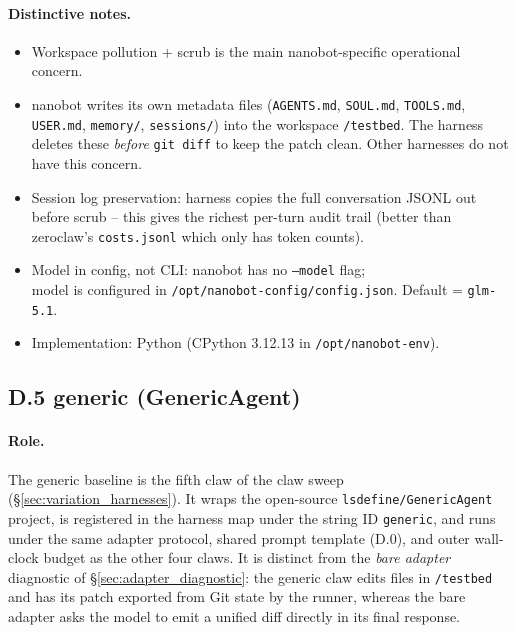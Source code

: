 \documentclass{llmxive}
\providecommand{\model}{\textsc{Model}}
\begin{document}
\paragraph{Distinctive notes.}
\begin{itemize}
  \item Workspace pollution + scrub is the main nanobot-specific operational concern.
  \item nanobot writes its own metadata files (\texttt{AGENTS.md}, \texttt{SOUL.md}, \texttt{TOOLS.md}, \texttt{USER.md}, \texttt{memory/}, \texttt{sessions/}) into the workspace \texttt{/testbed}. The harness deletes these \emph{before} \texttt{git diff} to keep the patch clean. Other harnesses do not have this concern.
  \item Session log preservation: harness copies the full conversation JSONL out before scrub -- this gives the richest per-turn audit trail (better than zeroclaw's \texttt{costs.jsonl} which only has token counts).
  \item Model in config, not CLI: nanobot has no \texttt{--model} flag;\\model is configured in \texttt{/opt/nanobot-config/config.json}. Default = \texttt{glm-5.1}.
  \item Implementation: Python (CPython 3.12.13 in \texttt{/opt/nanobot-env}).
\end{itemize}

\subsection*{D.5 generic (GenericAgent)}

\paragraph{Role.}
The generic baseline is the fifth claw of the claw sweep
(\S\ref{sec:variation_harnesses}). It wraps the open-source
\texttt{lsdefine/GenericAgent} project, is registered in the harness map under
the string ID \texttt{generic}, and runs under the same adapter protocol,
shared prompt template (D.0), and outer wall-clock budget as the other four
claws. It is distinct from the \emph{bare adapter} diagnostic of
\S\ref{sec:adapter_diagnostic}: the generic claw edits files in
\texttt{/testbed} and has its patch exported from Git state by the runner,
whereas the bare adapter asks the model to emit a unified diff directly in its
final response.
\end{document}
